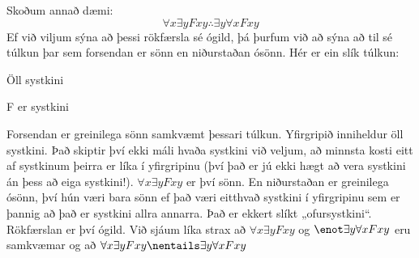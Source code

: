 Skoðum annað dæmi:
$$\forall x \exists y Fxy \therefore \exists y \forall x Fxy$$
Ef við viljum sýna að þessi rökfærsla sé ógild, þá þurfum við að sýna að til sé túlkun þar sem forsendan er sönn en niðurstaðan ósönn. Hér er ein slík túlkun:
\begin{ekey}
	\item[\text{yfirgrip}] Öll systkini
	\item[F]  er systkini 
\end{ekey}
Forsendan er greinilega sönn samkvæmt þessari túlkun. Yfirgripið inniheldur öll systkini. Það skiptir því ekki máli hvaða systkini við veljum, að minnsta kosti eitt af systkinum þeirra er líka í yfirgripinu (því það er jú ekki hægt að vera systkini án þess að eiga systkini!). $\forall x \exists y Fxy$ er því sönn. En niðurstaðan er greinilega ósönn, því hún væri bara sönn ef það væri eitthvað systkini í yfirgripinu sem er þannig að það er systkini allra annarra. Það er ekkert slíkt „ofursystkini“. Rökfærslan er því ógild. Við sjáum líka strax að $\forall x \exists y Fxy$ og $\enot\exists y \forall x Fxy$ eru samkvæmar og að $\forall x \exists y Fxy \nentails \exists y \forall x Fxy$

